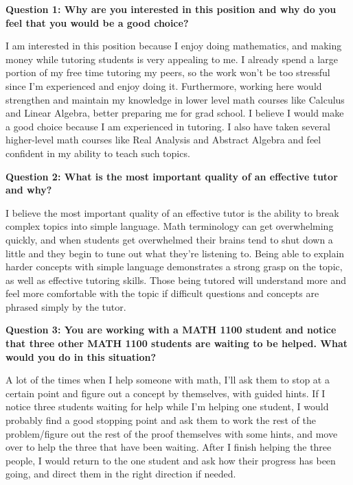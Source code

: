 \documentclass{article}
\begin{document}
\noindent
\textbf{Question 1: Why are you interested in this position and why do you feel that you would be a good choice?}

I am interested in this position because I enjoy doing mathematics, and making money while tutoring students is very appealing to me. I already spend a large portion of my free time tutoring my peers, so the work won’t be too stressful since I’m experienced and enjoy doing it. Furthermore, working here would strengthen and maintain my knowledge in lower level math courses like Calculus and Linear Algebra, better preparing me for grad school. I believe I would make a good choice because I am experienced in tutoring. I also have taken several higher-level math courses like Real Analysis and Abstract Algebra and feel confident in my ability to teach such topics. 

\vspace{3mm}
\noindent
\textbf{Question 2: What is the most important quality of an effective tutor and why?}

I believe the most important quality of an effective tutor is the ability to break complex topics into simple language. Math terminology can get overwhelming quickly, and when students get overwhelmed their brains tend to shut down a little and they begin to tune out what they’re listening to. Being able to explain harder concepts with simple language demonstrates a strong grasp on the topic, as well as effective tutoring skills. Those being tutored will understand more and feel more comfortable with the topic if difficult questions and concepts are phrased simply by the tutor. 

\vspace{3mm}
\noindent
\textbf{Question 3: You are working with a MATH 1100 student and notice that three other MATH 1100 students are waiting to be helped. What would you do in this situation? }

A lot of the times when I help someone with math, I’ll ask them to stop at a certain point and figure out a concept by themselves, with guided hints. If I notice three students waiting for help while I’m helping one student, I would probably find a good stopping point and ask them to work the rest of the problem/figure out the rest of the proof themselves with some hints, and move over to help the three that have been waiting. After I finish helping the three people, I would return to the one student and ask how their progress has been going, and direct them in the right direction if needed. 
\end{document}
